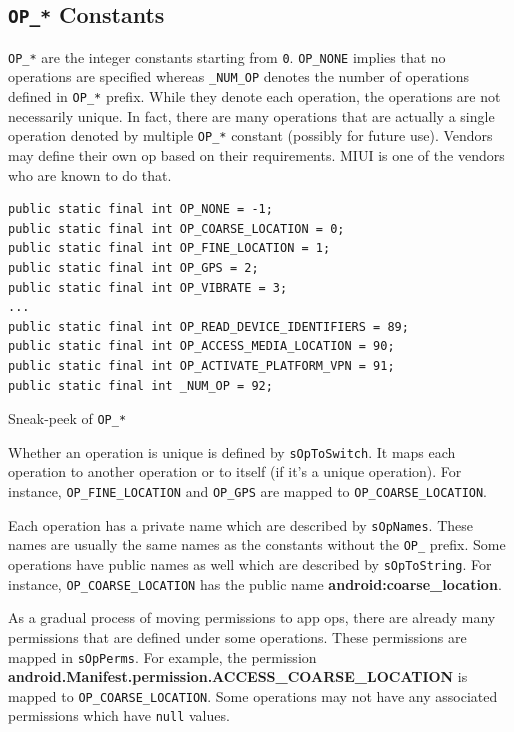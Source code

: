 
\subsection{\texttt{OP\_*} Constants}\label{subsec:op-constants}
\texttt{OP\_*} are the integer constants starting from \texttt{0}. \texttt{OP\_NONE} implies that no operations are
specified whereas \texttt{\_NUM\_OP} denotes the number of operations defined in \texttt{OP\_*} prefix. While they
denote each operation, the operations are not necessarily unique. In fact, there are many operations that are actually
a single operation denoted by multiple \texttt{OP\_*} constant (possibly for future use). Vendors may define their own
op based on their requirements. MIUI is one of the vendors who are known to do that.

\begin{listing}[ht]
    \begin{verbatim}
public static final int OP_NONE = -1;
public static final int OP_COARSE_LOCATION = 0;
public static final int OP_FINE_LOCATION = 1;
public static final int OP_GPS = 2;
public static final int OP_VIBRATE = 3;
...
public static final int OP_READ_DEVICE_IDENTIFIERS = 89;
public static final int OP_ACCESS_MEDIA_LOCATION = 90;
public static final int OP_ACTIVATE_PLATFORM_VPN = 91;
public static final int _NUM_OP = 92;
    \end{verbatim}
    \caption{Sneak-peek of \texttt{OP\_*}}
    \label{lst:op-constants}
\end{listing}

Whether an operation is unique is defined by \texttt{sOpToSwitch}.
It maps each operation to another operation or to itself (if it's a unique operation).
For instance, \texttt{OP\_FINE\_LOCATION} and \texttt{OP\_GPS} are mapped to \texttt{OP\_COARSE\_LOCATION}.

Each operation has a private name which are described by \texttt{sOpNames}.
These names are usually the same names as the constants without the \texttt{OP\_} prefix.
Some operations have public names as well which are described by \texttt{sOpToString}.
For instance, \texttt{OP\_COARSE\_LOCATION} has the public name \textbf{android:coarse\_location}.

As a gradual process of moving permissions to app ops, there are already many permissions that are defined under some operations.
These permissions are mapped in \texttt{sOpPerms}.
For example, the permission \textbf{android.Manifest.permission.ACCESS\_COARSE\_LOCATION} is mapped to
\texttt{OP\_COARSE\_LOCATION}. Some operations may not have any associated permissions which have \texttt{null} values.

